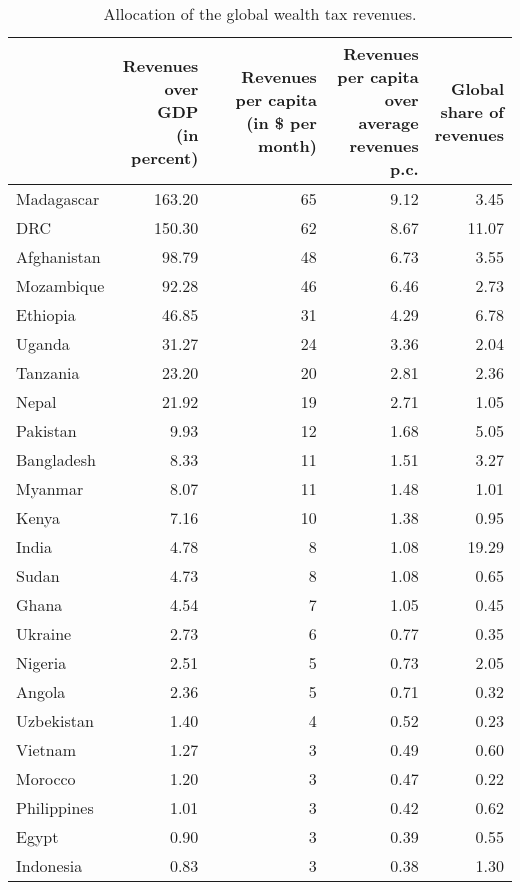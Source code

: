 
\begin{longtable}[t]{lrrrr}
\caption{\label{tab:allocation}Allocation of the global wealth tax revenues.}\\
\toprule
  & \makecell{Revenues\\over GDP\\(in percent)} & \makecell{Revenues\\per capita\\(in \$ per month)} & \makecell{Revenues per capita\\over average\\revenues p.c.} & \makecell{Global\\share of\\revenues}\\
\midrule
Madagascar & 163.20 & 65 & 9.12 & 3.45\\
DRC & 150.30 & 62 & 8.67 & 11.07\\
Afghanistan & 98.79 & 48 & 6.73 & 3.55\\
Mozambique & 92.28 & 46 & 6.46 & 2.73\\
Ethiopia & 46.85 & 31 & 4.29 & 6.78\\
Uganda & 31.27 & 24 & 3.36 & 2.04\\
Tanzania & 23.20 & 20 & 2.81 & 2.36\\
Nepal & 21.92 & 19 & 2.71 & 1.05\\
Pakistan & 9.93 & 12 & 1.68 & 5.05\\
Bangladesh & 8.33 & 11 & 1.51 & 3.27\\
Myanmar & 8.07 & 11 & 1.48 & 1.01\\
Kenya & 7.16 & 10 & 1.38 & 0.95\\
India & 4.78 & 8 & 1.08 & 19.29\\
Sudan & 4.73 & 8 & 1.08 & 0.65\\
Ghana & 4.54 & 7 & 1.05 & 0.45\\
Ukraine & 2.73 & 6 & 0.77 & 0.35\\
Nigeria & 2.51 & 5 & 0.73 & 2.05\\
Angola & 2.36 & 5 & 0.71 & 0.32\\
Uzbekistan & 1.40 & 4 & 0.52 & 0.23\\
Vietnam & 1.27 & 3 & 0.49 & 0.60\\
Morocco & 1.20 & 3 & 0.47 & 0.22\\
Philippines & 1.01 & 3 & 0.42 & 0.62\\
Egypt & 0.90 & 3 & 0.39 & 0.55\\
Indonesia & 0.83 & 3 & 0.38 & 1.30\\

\end{longtable}
